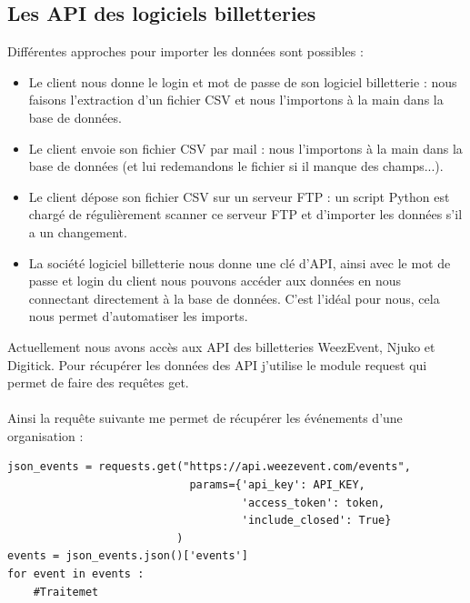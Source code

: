 \subsection{Les API des logiciels billetteries}
Différentes approches pour importer les données sont possibles : 
\begin{itemize}
  \item[\textbullet] Le client nous donne le login et mot de passe de son logiciel billetterie : nous faisons l'extraction d'un fichier CSV et nous l'importons à la main dans la base de données. 
  \item[\textbullet] Le client envoie son fichier CSV par mail : nous l'importons à la main dans la base de données (et lui redemandons le fichier si il manque des champs...).
  \item[\textbullet] Le client dépose son fichier CSV sur un serveur FTP : un script Python est chargé de régulièrement scanner ce serveur FTP et d'importer les données s'il a un changement.
  \item[\textbullet] La société logiciel billetterie nous donne une clé d'API, ainsi avec le mot de passe et login du client nous pouvons accéder aux données en nous connectant directement à la base de données. C'est l'idéal pour nous, cela nous permet d'automatiser les imports.
\end{itemize}

Actuellement nous avons accès aux API des billetteries WeezEvent, Njuko et Digitick. 
Pour récupérer les données des API j'utilise le module request qui permet de faire des requêtes get.
\\ \\
Ainsi la requête suivante me permet de récupérer les événements d'une organisation :

\lstset{style=custompython}
\begin{lstlisting}
json_events = requests.get("https://api.weezevent.com/events",
                            params={'api_key': API_KEY,
                                    'access_token': token,
                                    'include_closed': True}
                          )
events = json_events.json()['events']
for event in events :
	#Traitemet
\end{lstlisting}
\leavevmode \

